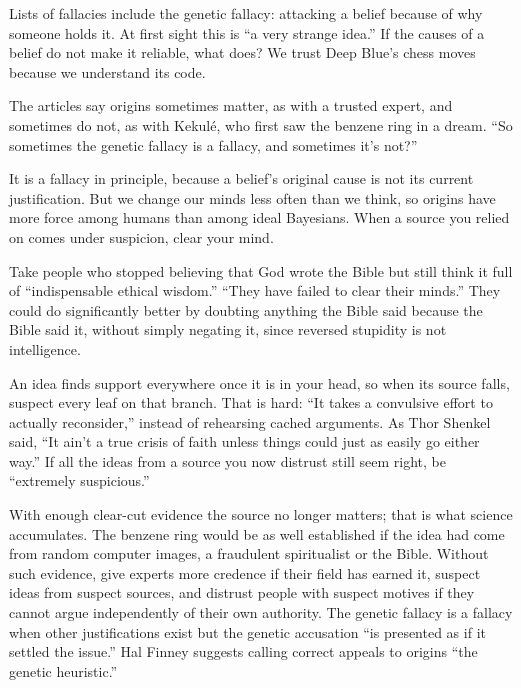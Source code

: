 
Lists of fallacies include the genetic fallacy: attacking a belief because of why someone holds it. At first sight this is ``a very strange idea.'' If the causes of a belief do not make it reliable, what does? We trust Deep Blue's chess moves because we understand its code.

The articles say origins sometimes matter, as with a trusted expert, and sometimes do not, as with Kekulé, who first saw the benzene ring in a dream. ``So sometimes the genetic fallacy is a fallacy, and sometimes it's not?'' 

It is a fallacy in principle, because a belief's original cause is not its current justification. But we change our minds less often than we think, so origins have more force among humans than among ideal Bayesians. When a source you relied on comes under suspicion, clear your mind. 

Take people who stopped believing that God wrote the Bible but still think it full of ``indispensable ethical wisdom.'' ``They have failed to clear their minds.''  They could do significantly better by doubting anything the Bible said because the Bible said it, without simply negating it, since reversed stupidity is not intelligence.

An idea finds support everywhere once it is in your head, so when its source falls, suspect every leaf on that branch. That is hard: ``It takes a convulsive effort to actually reconsider,'' instead of rehearsing cached arguments. As Thor Shenkel said, ``It ain't a true crisis of faith unless things could just as easily go either way.''  If all the ideas from a source you now distrust still seem right, be ``extremely suspicious.''

With enough clear-cut evidence the source no longer matters; that is what science accumulates. The benzene ring would be as well established if the idea had come from random computer images, a fraudulent spiritualist or the Bible. Without such evidence, give experts more credence if their field has earned it, suspect ideas from suspect sources, and distrust people with suspect motives if they cannot argue independently of their own authority. The genetic fallacy is a fallacy when other justifications exist but the genetic accusation ``is presented as if it settled the issue.'' Hal Finney suggests calling correct appeals to origins ``the genetic heuristic.'' 

